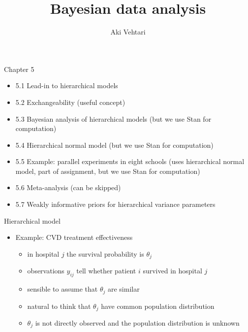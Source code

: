 \documentclass[finnish,english,t]{beamer}
\title[]{Bayesian data analysis}
\subtitle{}
\author{Aki Vehtari}
\institute[Aalto]{}
\begin{document}
\begin{frame}{Chapter 5}

  \begin{itemize}
\item 5.1 Lead-in to hierarchical models
\item 5.2 Exchangeability (useful concept)
\item 5.3 Bayesian analysis of hierarchical models (but we use Stan for computation)
\item 5.4 Hierarchical normal model (but we use Stan for computation)
\item 5.5 Example: parallel experiments in eight schools (uses hierarchical normal model, part of assignment, but we use Stan for computation)
\item {\color{gray}5.6 Meta-analysis (can be skipped)}
\item 5.7 Weakly informative priors for hierarchical variance parameters
\end{itemize}
\end{frame}

\begin{frame}{Hierarchical model}

  \begin{itemize}
  \item Example: CVD treatment effectiveness
    \begin{itemize}
    \item in hospital $j$ the survival probability is $\theta_j$
    \item observations $y_{ij}$ tell whether patient $i$ survived in
      hospital $j$
        \begin{xy}
        \end{xy}
        \pause
      \item sensible to assume that $\theta_j$ are similar
        \begin{xy}
        \end{xy}
      \item natural to think that $\theta_j$ have common population distribution
      \item $\theta_j$ is not directly observed and the population
        distribution is unknown
    \end{itemize}
  \end{itemize}
\end{frame}
\end{document}

